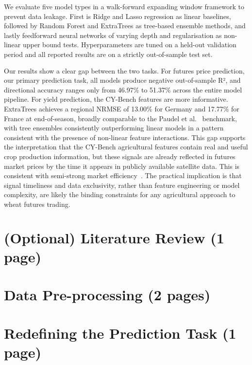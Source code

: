 \documentclass[pdflatex,sn-mathphys-num, oneside]{sn-jnl}%
\theoremstyle{thmstyleone}%
\theoremstyle{thmstyletwo}%
\theoremstyle{thmstylethree}%
\begin{document}
We evaluate five model types in a walk-forward expanding window framework to prevent data leakage. First is Ridge and Lasso regression as linear baselines, followed by Random Forest and ExtraTrees as tree-based ensemble methods, and lastly feedforward neural networks of varying depth and regularisation as non-linear upper bound tests. Hyperparameters are tuned on a held-out validation period and all reported results are on a strictly out-of-sample test set.

Our results show a clear gap between the two tasks. For futures price prediction, our primary prediction task, all models produce negative out-of-sample R², and directional accuracy ranges only from 46.97\% to 51.37\% across the entire model pipeline. For yield prediction, the CY-Bench features are more informative. ExtraTrees achieves a regional NRMSE of 13.00\% for Germany and 17.77\% for France at end-of-season, broadly comparable to the Paudel et al.~\cite{bib16} benchmark, with tree ensembles consistently outperforming linear models in a pattern consistent with the presence of non-linear feature interactions. This gap supports the interpretation that the CY-Bench agricultural features contain real and useful crop production information, but these signals are already reflected in futures market prices by the time it appears in publicly available satellite data. This is consistent with semi-strong market efficiency~\cite{bib30}. The practical implication is that signal timeliness and data exclusivity, rather than feature engineering or model complexity, are likely the binding constraints for any agricultural approach to wheat futures trading.

\clearpage

\section{(Optional) Literature Review (1 page)}\label{sec3}

\clearpage

\section{Data Pre-processing (2 pages)}\label{sec3}

\clearpage

\section{Redefining the Prediction Task (1 page)}\label{sec3}
\end{document}
